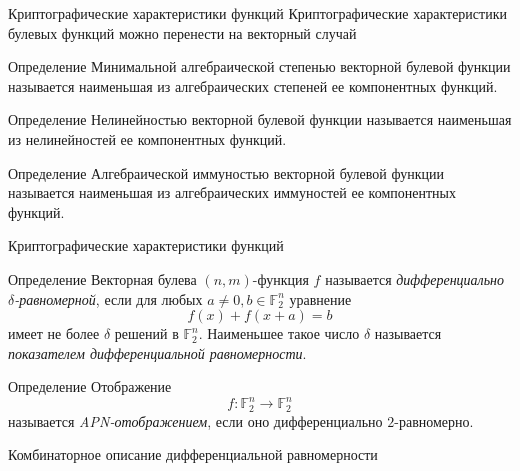 \documentclass{beamer}
\begin{document}
\begin{frame}{Криптографические характеристики функций}
Криптографические характеристики булевых функций можно перенести на векторный случай
   \begin{block}{Определение}
Минимальной алгебраической степенью векторной булевой функции называется наименьшая из алгебраических степеней ее компонентных функций.
\end{block} 
\begin{block}{Определение}
Нелинейностью векторной булевой функции называется наименьшая из нелинейностей ее компонентных функций.
\end{block} 
\begin{block}{Определение}
Алгебраической иммуностью векторной булевой функции называется наименьшая из алгебраических иммуностей ее компонентных функций.
\end{block} 
\end{frame}

\begin{frame}{Криптографические характеристики функций}
\begin{block}{Определение}
Векторная булева $(n,m)$-функция $f$ называется \textit{дифференциально $\delta$-равномерной}, если для любых $a \neq 0, b \in \mathbb{F}_{2}^{n}$ уравнение $$f(x) + f(x + a) = b$$ имеет не более $\delta$ решений в $\mathbb{F}_{2}^{n}$. Наименьшее такое число $\delta$ называется \textit{показателем дифференциальной равномерности}.
\end{block}

\begin{block}{Определение}
    Отображение $$f: \mathbb{F}_{2}^{n} \xrightarrow{} \mathbb{F}_{2}^{n}$$
    называется \textit{APN-отображением}, если оно дифференциально $2$-равномерно.
\end{block}


\end{frame}




\begin{frame}{Комбинаторное описание дифференциальной равномерности}
\end{frame}
\end{document}
